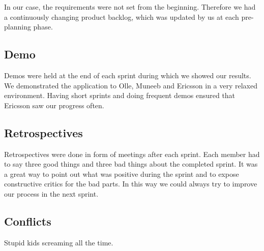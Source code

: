 In our case, the requirements were not set from the beginning. Therefore we had a continuously
changing product backlog, which was updated by us at each pre-planning phase.

\subsection{Demo}
Demos were held at the end of each sprint during which we showed our results.
We demonstrated the application to Olle, Muneeb and Ericsson in a very relaxed environment. Having short sprints and doing frequent
demos ensured that Ericsson saw our progress often.

\subsection{Retrospectives}
Retrospectives were done in form of meetings after each sprint. Each member had to say three good things and three bad things about
the completed sprint. It was a great way to point out what was positive during the sprint
and to expose constructive critics for the bad parts. In this way we could always try to improve our process in the next sprint.

\subsection{Conflicts}
Stupid kids screaming all the time.
